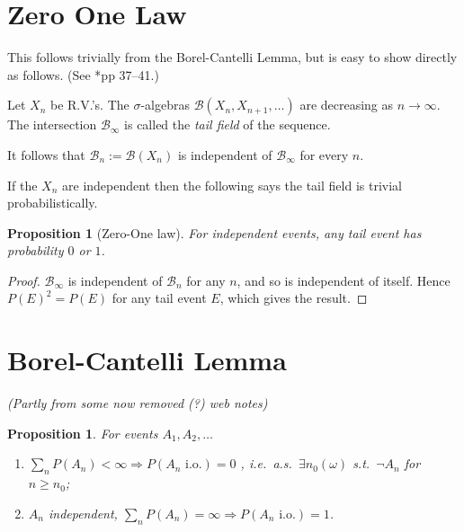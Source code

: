 \documentclass[a4paper]{amsart}
\theoremstyle{plain}
\newtheorem{proposition}[theorem]{Proposition}
\theoremstyle{definition}
\theoremstyle{remark}
\begin{document}
\section{Zero One Law}  This follows trivially from the Borel-Cantelli Lemma, but is easy to show directly as follows.
(See \cite{Lam}*{pp 37--41}.)



Let $ X_n $ be R.V.'s.  The $ \sigma $-algebras $ \mathcal{B}(X_n,X_{n+1}, \dots ) $  are decreasing as $ n \to \infty $.  The intersection $ \mathcal{B}_\infty $ is called the \emph{tail field} of the sequence.

It follows that $ \mathcal{B}_n := \mathcal{B} (X_n ) $ is independent of $   \mathcal{B}_\infty $ for every $ n $.

If the $ X_n $ are independent then the following says   the tail field is trivial probabilistically.

\begin{proposition}
[Zero-One law]  For independent events, any tail event has probability $ 0 $ or $ 1 $.
\end{proposition} 

\begin{proof} $ \mathcal{B}_\infty $ is independent of $ \mathcal{B}_n $ for any $ n $, and so is independent of itself.  Hence $ P(E)^2 = P(E) $ for any tail event $ E $, which gives the result.
\end{proof} 




\section{Borel-Cantelli Lemma}

\noindent \emph{(Partly from some now removed (?) web notes)}
\begin{proposition}  
For events $ A_1, A_2, \dots $ 
\begin{enumerate}

\item $ \sum_n P(A_n) <\infty \Longrightarrow P(A_n \text{ i.o.}) = 0$ , i.e.\ a.s.\ $ \exists n_0( \omega ) $ s.t.\ $ \neg A_n $ for $ n \geq n_0 $;
\item $ A_n $ independent, $ \sum_n P(A_n) = \infty \Longrightarrow P(A_n \text{ i.o.}) = 1 $. 
\end{enumerate} 
\end{proposition} 
\end{document}
